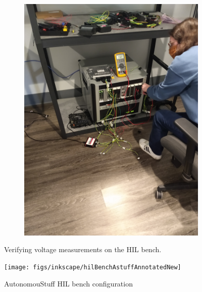 \documentclass[conference]{IEEEtran}
\begin{document}
\begin{figure}
\begin{subfigure}[b]{0.48\linewidth}
    		\includegraphics[angle=270,width=0.9\linewidth]{figs/img/picturesVisitToAStuff/hilMeasurementHannah}
    		\caption{}
    \end{subfigure}
    \caption{Verifying voltage measurements on the HIL bench.}
    \label{fig:hilMeasuring}
\end{figure}

\begin{figure}
  \centering
    \texttt{[image: figs/inkscape/hilBenchAstuffAnnotatedNew]}
  \caption{AutonomouStuff HIL bench configuration}
  \label{fig:hilBench}
\end{figure}

\end{document}
